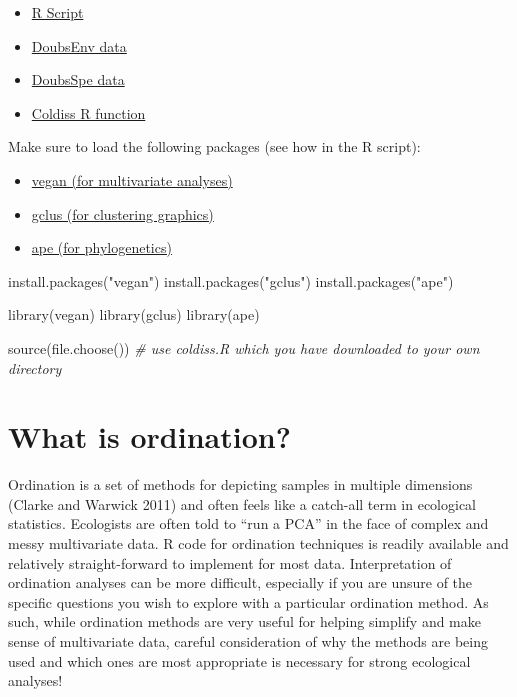\documentclass[
]{book}
\newenvironment{Shaded}{\begin{snugshade}}{\end{snugshade}}
\newcommand{\CommentTok}[1]{\textcolor[rgb]{0.56,0.35,0.01}{\textit{#1}}}
\newcommand{\FunctionTok}[1]{\textcolor[rgb]{0.00,0.00,0.00}{#1}}
\newcommand{\NormalTok}[1]{#1}
\newcommand{\StringTok}[1]{\textcolor[rgb]{0.31,0.60,0.02}{#1}}
\providecommand{\tightlist}{%
  \setlength{\itemsep}{0pt}\setlength{\parskip}{0pt}}
\begin{document}
\begin{itemize}
\tightlist
\item
  \href{http://qcbs.ca/wiki/_media/multivar1_e.r}{R Script}
\item
  \href{http://qcbs.ca/wiki/_media/DoubsEnv.csv}{DoubsEnv data}
\item
  \href{http://qcbs.ca/wiki/_media/DoubsSpe.csv}{DoubsSpe data}
\item
  \href{http://qcbs.ca/wiki/_media/coldiss.R}{Coldiss R function}
\end{itemize}

Make sure to load the following packages (see how in the R script):

\begin{itemize}
\tightlist
\item
  \href{http://cran.r-project.org/web/packages/vegan/index.html}{vegan (for multivariate
  analyses)}
\item
  \href{http://cran.r-project.org/web/packages/gclus/index.html}{gclus (for clustering
  graphics)}
\item
  \href{http://cran.r-project.org/web/packages/ape/index.html}{ape (for
  phylogenetics)}
\end{itemize}

\begin{Shaded}
\begin{Highlighting}[]
\FunctionTok{install.packages}\NormalTok{(}\StringTok{"vegan"}\NormalTok{)}
\FunctionTok{install.packages}\NormalTok{(}\StringTok{"gclus"}\NormalTok{)}
\FunctionTok{install.packages}\NormalTok{(}\StringTok{"ape"}\NormalTok{)}

\FunctionTok{library}\NormalTok{(vegan)}
\FunctionTok{library}\NormalTok{(gclus)}
\FunctionTok{library}\NormalTok{(ape)}

\FunctionTok{source}\NormalTok{(}\FunctionTok{file.choose}\NormalTok{()) }\CommentTok{\# use coldiss.R which you have downloaded to your own directory}
\end{Highlighting}
\end{Shaded}

\hypertarget{what-is-ordination}{%
\chapter{What is ordination?}\label{what-is-ordination}}

Ordination is a set of methods for depicting samples in multiple
dimensions (Clarke and Warwick 2011) and often feels like a catch-all
term in ecological statistics. Ecologists are often told to ``run a PCA''
in the face of complex and messy multivariate data. R code for
ordination techniques is readily available and relatively
straight-forward to implement for most data. Interpretation of
ordination analyses can be more difficult, especially if you are unsure
of the specific questions you wish to explore with a particular
ordination method. As such, while ordination methods are very useful for
helping simplify and make sense of multivariate data, careful
consideration of why the methods are being used and which ones are most
appropriate is necessary for strong ecological analyses!
\end{document}
